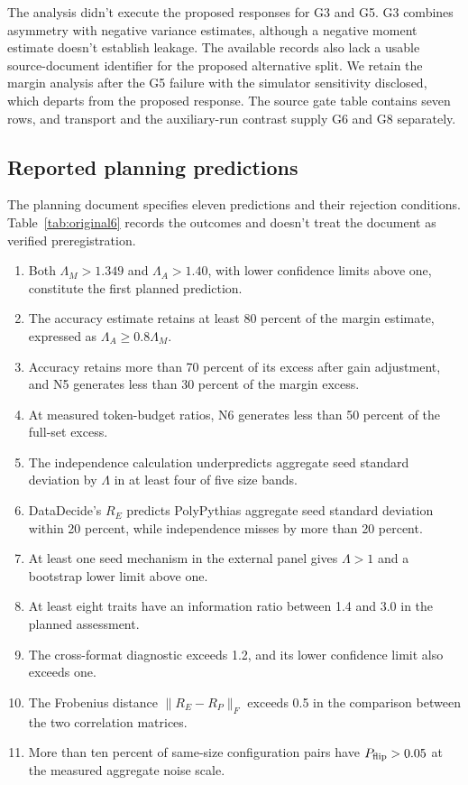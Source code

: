 The analysis didn't execute the proposed responses for G3 and G5. G3 combines asymmetry with negative variance estimates, although a negative moment estimate doesn't establish leakage. The available records also lack a usable source-document identifier for the proposed alternative split. We retain the margin analysis after the G5 failure with the simulator sensitivity disclosed, which departs from the proposed response. The source gate table contains seven rows, and transport and the auxiliary-run contrast supply G6 and G8 separately.


\subsection{Reported planning predictions}
The planning document specifies eleven predictions and their rejection conditions. Table~\ref{tab:original6} records the outcomes and doesn't treat the document as verified preregistration.
\begin{enumerate}
\item Both $\Lambda_M>1.349$ and $\Lambda_A>1.40$, with lower confidence limits above one, constitute the first planned prediction.
\item The accuracy estimate retains at least 80 percent of the margin estimate, expressed as $\Lambda_A\geq0.8\Lambda_M$.
\item Accuracy retains more than 70 percent of its excess after gain adjustment, and N5 generates less than 30 percent of the margin excess.
\item At measured token-budget ratios, N6 generates less than 50 percent of the full-set excess.
\item The independence calculation underpredicts aggregate seed standard deviation by $\Lambda$ in at least four of five size bands.
\item DataDecide's $R_E$ predicts PolyPythias aggregate seed standard deviation within 20 percent, while independence misses by more than 20 percent.
\item At least one seed mechanism in the external panel gives $\Lambda>1$ and a bootstrap lower limit above one.
\item At least eight traits have an information ratio between 1.4 and 3.0 in the planned assessment.
\item The cross-format diagnostic exceeds 1.2, and its lower confidence limit also exceeds one.
\item The Frobenius distance $\|R_E-R_P\|_F$ exceeds 0.5 in the comparison between the two correlation matrices.
\item More than ten percent of same-size configuration pairs have $P_{\rm flip}>0.05$ at the measured aggregate noise scale.
\end{enumerate}


